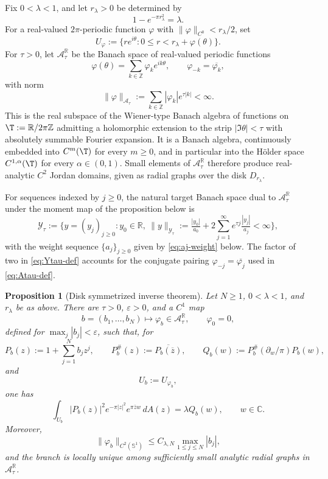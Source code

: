 \documentclass[a4paper,11pt,reqno]{amsart}
\numberwithin{equation}{section}
\theoremstyle{plain} %
\newtheorem{proposition}{Proposition}[section]
\theoremstyle{definition} %
\theoremstyle{remark}
\newcommand{\R}{\mathbb{R}}
\newcommand{\C}{\mathbb{C}}
\newcommand{\Z}{\mathbb{Z}}
\begin{document}
Fix \(0<\lambda<1\), and let \(r_\lambda>0\) be determined by
\[
1-e^{-\pi r_\lambda^2}=\lambda .
\]
For a real-valued \(2\pi\)-periodic function \(\varphi\) with
\(\|\varphi\|_{C^0}<r_\lambda/2\), set
\[
U_\varphi
:=
\{re^{i\theta}:0\le r<r_\lambda+\varphi(\theta)\}.
\]
For \(\tau>0\), let \(\mathcal A_\tau^\R\) be the Banach space of real-valued
periodic functions
\begin{equation}\label{eq:Atau-def}
\varphi(\theta)=\sum_{k\in\Z}\varphi_k e^{ik\theta},
\qquad
\varphi_{-k}=\overline{\varphi_k},
\end{equation}
with norm
\begin{equation}\label{eq:Atau-norm}
\|\varphi\|_{\mathcal A_\tau}
:=
\sum_{k\in\Z}|\varphi_k|e^{\tau |k|}<\infty .
\end{equation}
This is the real subspace of the Wiener-type Banach algebra of functions on
\(\T:=\R/2\pi\Z\) admitting a holomorphic extension to the strip
\(|\Im\theta|<\tau\) with absolutely summable Fourier expansion. It is a Banach
algebra, continuously embedded into \(C^m(\T)\) for every \(m\ge0\), and in
particular into the H\"older space \(C^{1,\alpha}(\T)\) for every
\(\alpha\in(0,1)\). Small elements of \(\mathcal A_\tau^\R\) therefore produce
real-analytic \(C^2\) Jordan domains, given as radial graphs over the disk
\(D_{r_\lambda}\).

For sequences indexed by \(j\ge0\), the natural target Banach space dual to
\(\mathcal A_\tau^\R\) under the moment map of the proposition below is
\begin{equation}\label{eq:Ytau-def}
\mathcal Y_\tau:=
\Big\{y=(y_j)_{j\ge0}\colon y_0\in\R,\ \|y\|_{\mathcal Y_\tau}
:=\tfrac{|y_0|}{a_0}+2\sum_{j=1}^\infty e^{\tau j}\tfrac{|y_j|}{a_j}<\infty\Big\},
\end{equation}
with the weight sequence \(\{a_j\}_{j\ge0}\) given by \eqref{eq:aj-weight}
below. The factor of two in \eqref{eq:Ytau-def} accounts for the conjugate
pairing \(\varphi_{-j}=\overline{\varphi_j}\) used in \eqref{eq:Atau-def}.

\begin{proposition}[Disk symmetrized inverse theorem]\label{prop:disk-inverse-tailored}
Let \(N\ge1\), \(0<\lambda<1\), and \(r_\lambda\) be as above. There are
\(\tau>0\), \(\varepsilon>0\), and a \(C^1\) map
\[
b=(b_1,\ldots,b_N)\longmapsto \varphi_b\in\mathcal A_\tau^\R,
\qquad
\varphi_0=0,
\]
defined for \(\max_j|b_j|<\varepsilon\), such that, for
\[
P_b(z):=1+\sum_{j=1}^N b_jz^j,
\qquad
P_b^\#(z):=\overline{P_b(\overline z)},
\qquad
Q_b(w):=P_b^\#(\partial_w/\pi)P_b(w),
\]
and
\[
U_b:=U_{\varphi_b},
\]
one has
\begin{equation}\label{eq:disk-inverse-identity}
\int_{U_b}|P_b(z)|^2e^{-\pi |z|^2}e^{\pi\overline z w}\,dA(z)
=
\lambda Q_b(w),
\qquad w\in\C .
\end{equation}
Moreover,
\[
\|\varphi_b\|_{C^2(\mathbb S^1)}
\le C_{\lambda,N}\max_{1\le j\le N}|b_j|,
\]
and the branch is locally unique among sufficiently small analytic radial
graphs in \(\mathcal A_\tau^\R\).
\end{proposition}
\end{document}
